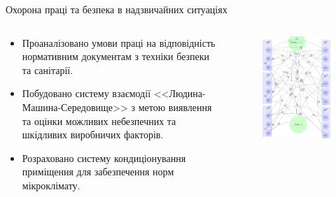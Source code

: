 \documentclass[10pt, ucs]{beamer}
\begin{document}
\begin{frame}[shrink]{Охорона праці та безпека в надзвичайних ситуаціях}
    \begin{columns}
        \begin{column}{0.55\textwidth}
            \begin{itemize}
                \item Проаналізовано умови праці на відповідність нормативним
                    документам з техніки безпеки та санітарії. \\[1em]
                \item Побудовано систему взаємодії <<Людина-Машина-Середовище>> з метою
                    виявлення та оцінки можливих небезпечних та шкідливих виробничих
                    факторів. \\[1em]
                \item Розраховано систему кондиціонування приміщення для
                    забезпечення норм мікроклімату.
            \end{itemize}
        \end{column}%
        \begin{column}{0.5\textwidth}
            \begin{figure}[htbp]
                \centering
                \includegraphics[scale=0.3]{labour_graph}
            \end{figure}
        \end{column}
    \end{columns}
\end{frame}
\end{document}
